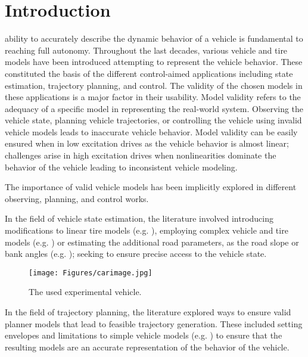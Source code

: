 \documentclass[journal]{IEEEtran}
\begin{document}
\section{Introduction}
 ability to accurately describe the dynamic behavior of a vehicle is fundamental to reaching full autonomy. Throughout the last decades, various vehicle and tire models have been introduced attempting to represent the vehicle behavior. These constituted the basis of the different control-aimed applications including state estimation, trajectory planning, and control. The validity of the chosen models in these applications is a major factor in their usability. Model validity refers to the adequacy of a specific model in representing the real-world system. Observing the vehicle state, planning vehicle trajectories, or controlling the vehicle using invalid vehicle models leads to inaccurate vehicle behavior. Model validity can be easily ensured when in low excitation drives as the vehicle behavior is almost linear; challenges arise in high excitation drives when nonlinearities dominate the behavior of the vehicle leading to inconsistent vehicle modeling.   
    
The importance of valid vehicle models has been implicitly explored in different observing, planning, and control works. 

In the field of vehicle state estimation, the literature involved introducing modifications to linear tire models (e.g. \cite{reina_vehicle_2019, van_aalst_adaptive_2018}), employing complex vehicle and tire models (e.g. \cite{katriniok_adaptive_2016, wang_estimation_2010}) or estimating the additional road parameters, as the road slope or bank angles (e.g. \cite{zhao_linhui_vehicle_2008, guo_modular_2016, yin_design_2017}); seeking to ensure precise access to the vehicle state.

\begin{figure}[h]
    \centering
    \texttt{[image: Figures/carimage.jpg]}
    \caption{The used experimental vehicle.}
    \label{stadtpilot.fig}
\end{figure}

In the field of trajectory planning, the literature explored ways to ensure valid planner models that lead to feasible trajectory generation. These included setting envelopes and limitations to simple vehicle models (e.g. \cite{polack_kinematic_2017, altche_simple_2017}) to ensure that the resulting models are an accurate representation of the behavior of the vehicle.
\end{document}
